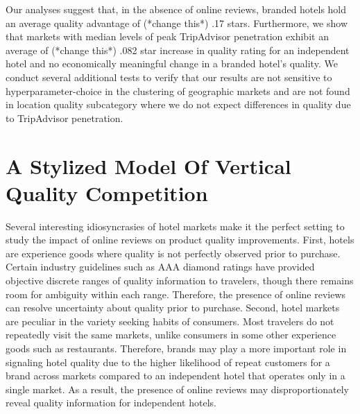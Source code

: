 \documentclass[mksc,blindrev]{informs3} %
\begin{document}
Our analyses suggest that, in the absence of online reviews, branded hotels hold an average quality advantage of (*change this*) .17 stars. Furthermore, we show that markets with median levels of peak TripAdvisor penetration exhibit an average of (*change this*) .082 star increase in quality rating for an independent hotel and no economically meaningful change in a branded hotel's quality. We conduct several additional tests to verify that our results are not sensitive to hyperparameter-choice in the clustering of geographic markets and are not found in location quality subcategory where we do not expect differences in quality due to TripAdvisor penetration.


\section{A Stylized Model Of Vertical Quality Competition} \label{sec:theory}

Several interesting idiosyncrasies of hotel markets make it the perfect setting to study the impact of online reviews on product quality improvements. First, hotels are experience goods where quality is not perfectly observed prior to purchase. Certain industry guidelines such as AAA diamond ratings have provided objective discrete ranges of quality information to travelers, though there remains room for ambiguity within each range. Therefore, the presence of online reviews can resolve uncertainty about quality prior to purchase. Second, hotel markets are peculiar in the variety seeking habits of consumers. Most travelers do not repeatedly visit the same markets, unlike consumers in some other experience goods such as restaurants. Therefore, brands may play a more important role in signaling hotel quality due to the higher likelihood of repeat customers for a brand across markets compared to an independent hotel that operates only in a single market. As a result, the presence of online reviews may disproportionately reveal quality information for independent hotels.
\end{document}
